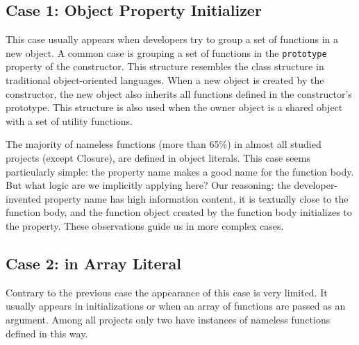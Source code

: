 \documentclass[10pt, preprint]{sigplanconf}
\begin{document}
\subsection{Case 1: Object Property Initializer}
 This case usually appears when developers try to group a set of functions in a new object. A common case is grouping a set of functions in the {\small\texttt{prototype}} property of the constructor. This structure resembles the class structure in traditional object-oriented languages. When a new object is created by the constructor, the new object also inherits all functions defined in the constructor's prototype. This structure is also used  when the owner object is a shared object with a set of utility functions.
 
 The majority of nameless functions (more than 65\%) in almost all studied projects (except Closure), are defined in object literals. This case seems particularly simple: the property name makes a good name for the function body. But what logic are we implicitly applying here? Our reasoning: the developer-invented property name has high information content, it is textually close to the function body, and the function object created by the function body initializes to the property. These observations guide us in more complex cases.
 
\subsection{Case 2: in Array Literal}
Contrary to the previous case the appearance of this case is very limited. It usually appears in initializations or when an array of functions are passed as an argument. Among all projects only two have instances of nameless functions defined in this way. 
\end{document}
